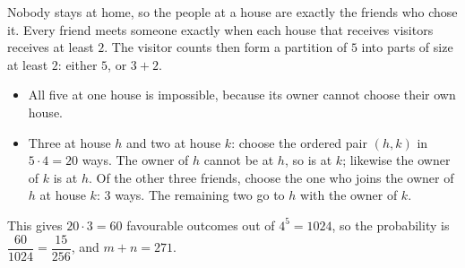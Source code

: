 Nobody stays at home, so the people at a house are exactly the friends who chose it. Every friend meets someone exactly when each house that receives visitors receives at least $2$. The visitor counts then form a partition of $5$ into parts of size at least $2$: either $5$, or $3+2$.
\begin{itemize}
\item All five at one house is impossible, because its owner cannot choose their own house.
\item Three at house $h$ and two at house $k$: choose the ordered pair $(h,k)$ in $5\cdot4=20$ ways. The owner of $h$ cannot be at $h$, so is at $k$; likewise the owner of $k$ is at $h$. Of the other three friends, choose the one who joins the owner of $h$ at house $k$: $3$ ways. The remaining two go to $h$ with the owner of $k$.
\end{itemize}
This gives $20\cdot3=60$ favourable outcomes out of $4^5=1024$, so the probability is $\dfrac{60}{1024}=\dfrac{15}{256}$, and $m+n=\boxed{271}$.
